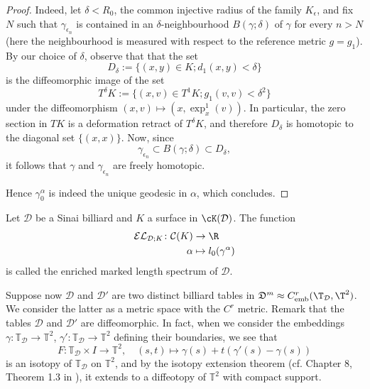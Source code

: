 \documentclass[reqno,11pt]{amsart}
\begin{document}
\begin{proof}
    Indeed, let \( \delta < R_0\), the common injective radius of the family \( K_\epsilon \), and fix \( N \) such that 
    \( \gamma_{\epsilon_n} \) is contained in an \( \delta \)-neighbourhood \( B(\gamma; \delta) \) of \( \gamma \) for every \( n > N \) (here the neighbourhood is measured with respect to the reference metric \(g = g_1 \)).
    By our choice of \( \delta \), observe that that the set
    \[
        D_\delta := \{(x,y) \in K; d_1(x,y) < \delta\}
    \]
    is the diffeomorphic image of the set 
    \[
       T^\delta K := \{(x,v) \in T^1K; g_1(v, v) < \delta^2\}
    \]
    under the diffeomorphism \( (x,v) \mapsto (x, \exp_x^1(v))\).
    In particular, the zero section in \( TK \) is a deformation retract of \( T^\delta K \), and therefore \( D_\delta \) is homotopic to the diagonal set \( \{(x,x)\} \).
    Now, since 
    \[
        \gamma_{\epsilon_n} \subset B(\gamma; \delta) \subset D_\delta,
    \]
    it follows that \( \gamma \) and \( \gamma_{\epsilon_n}\) are freely homotopic.
    \par Hence \( \gamma^\alpha_0 \) is indeed the unique geodesic in \( \alpha \), which concludes.
\end{proof}
\begin{defi}
    Let \( \mathcal{D} \) be a Sinai billiard and \( K \) a surface in \( \cK(\mathcal{D}) \).
    The function 
    \begin{align*}
        \mathcal{EL}_{\mathcal{D}; K}\colon \mathcal{C}(K) &\to \R \\
        \alpha &\mapsto l_0(\gamma^\alpha)
    \end{align*}
    is called the enriched marked length spectrum of \( \mathcal{D} \).    
\end{defi}
\par Suppose now \( \mathcal{D} \) and \( \mathcal{D}' \) are two distinct billiard tables in \( \mathfrak{D}^m \approx C^r_{\text{emb}}(\T_\mathcal{D}, \T^2) \).  
We consider the latter as a metric space with the \( C^r \) metric.  
Remark that the tables \( \mathcal{D} \) and \( \mathcal{D}' \) are diffeomorphic.  
In fact, when we consider the embeddings \(\gamma\colon\mathbb{T}_\mathcal{D} \to \mathbb{T}^2 \), \( \gamma'\colon\mathbb{T}_\mathcal{D} \to \mathbb{T}^2 \) defining their boundaries, we see that  
\[
    F\colon \mathbb{T}_\mathcal{D} \times I \to \mathbb{T}^2, \quad (s,t) \mapsto \gamma(s) + t(\gamma'(s)-\gamma(s))
\]
is an isotopy of \( \mathbb{T}_\mathcal{D} \) on \( \mathbb{T}^2 \), and by the isotopy extension theorem (cf. Chapter 8, Theorem 1.3 in \cite{hirsch2012differential}), it extends to a diffeotopy of \( \mathbb{T}^2 \) with compact support.  
\end{document}
